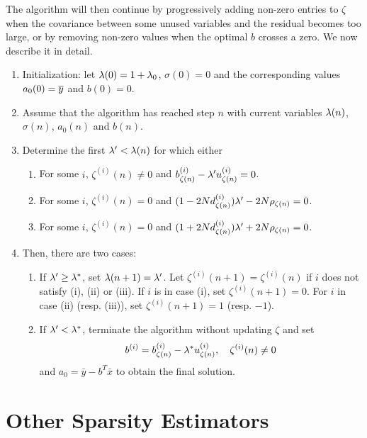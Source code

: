 The algorithm will then continue by progressively adding non-zero entries to $\zeta$ when the covariance between some unused variables and the residual becomes too large, or by removing non-zero values when the optimal $b$ crosses a zero. We now describe it in detail.

\begin{algorithm}
\label{alg:lasso.exact}
\begin{enumerate}[label = \arabic*., wide=0.25cm]
\item Initialization: let $\lambda(0) = 1 +  \lambda_0$, $\sigma(0) = 0$ and the corresponding values $a_0(0)=\overline{y}$ and $b(0) = 0$. 
\item Assume that the algorithm has reached step $n$ with current variables $\lambda(n)$, $\sigma(n)$, ${a_0}(n)$ and $b(n)$. 
\item Determine the first $\lambda'<\lambda(n)$ for which either
\begin{enumerate}[label=(\roman*),wide=.5cm,leftmargin=.5cm]
\item For some $i$, $\zeta^{(i)}(n) \neq 0$ and  $b_{\zeta(n)}^{(i)} - \lambda' u_{\zeta(n)}^{(i)} = 0$.
\item For some $i$, $\zeta^{(i)}(n) = 0$ and $(1- 2Nd_{\zeta(n)}^{(i)}) \lambda'- 2N\rho_{\zeta(n)} = 0$.
\item For some $i$, $\zeta^{(i)}(n) = 0$ and $(1+2Nd_{\zeta(n)}^{(i)}) \lambda'+ 2N\rho_{\zeta(n)} = 0$.
\end{enumerate}
\item 
Then, there are two cases: 
\begin{enumerate}[label=(\alph*), wide=0.5cm,leftmargin=.5cm]
\item If $\lambda' \geq \lambda^*$, set $\lambda(n+1) = \lambda'$. Let $\zeta^{(i)}(n+1) = \zeta^{(i)}(n)$ if $i$ does not satisfy (i), (ii) or (iii). If $i$ is in case (i), set $\zeta^{(i)}(n+1) = 0$. For $i$ in case (ii) (resp. (iii)), set $\zeta^{(i)}(n+1) = 1$ (resp. $-1$).
\item
If $\lambda' < \lambda^*$, terminate the algorithm without updating $\zeta$ and set
\[
b^{(i)} =b_{\zeta(n)}^{(i)} - \lambda^* u_{\zeta(n)}^{(i)}, \quad \zeta^{(i)}(n) \neq 0
\]
and ${a_0} = \bar y - b^T\bar x$ to obtain the final solution.
\end{enumerate}
\end{enumerate}
\end{algorithm}


\section{Other Sparsity Estimators}
